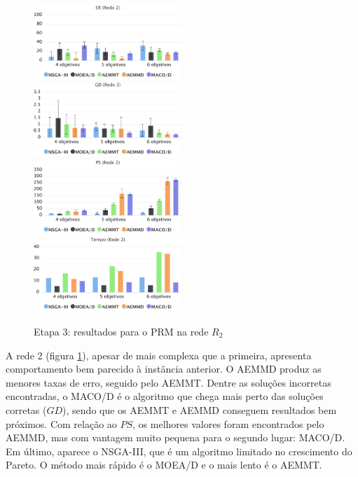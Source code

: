 \begin{figure}[!htbp]
	\caption{Etapa 3: resultados para o PRM na rede $R_2$}
	\label{fig_exp3_prm_r2}
	\includegraphics[width=0.5\textwidth]{cap_experimentos/figs/etapa3/er-mrp-r2}
	\includegraphics[width=0.5\textwidth]{cap_experimentos/figs/etapa3/gd-mrp-r2}
	\includegraphics[width=0.5\textwidth]{cap_experimentos/figs/etapa3/ps-mrp-r2}
	\includegraphics[width=0.5\textwidth]{cap_experimentos/figs/etapa3/time-mrp-r2}
\end{figure}

A rede 2 (figura \ref{fig_exp3_prm_r2}), apesar de mais complexa que a primeira, apresenta comportamento bem parecido à instância anterior. O AEMMD produz as menores taxas de erro, seguido pelo AEMMT. Dentre as soluções incorretas encontradas, o MACO/D é o algoritmo que chega mais perto das soluções corretas ($GD$), sendo que os AEMMT e AEMMD conseguem resultados bem próximos. Com relação ao $PS$, os melhores valores foram encontrados pelo AEMMD, mas com vantagem muito pequena para o segundo lugar: MACO/D. Em último, aparece o NSGA-III, que é um algoritmo limitado no crescimento do Pareto. O método mais rápido é o MOEA/D e o mais lento é o AEMMT.

